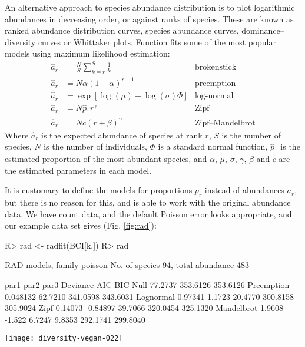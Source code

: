 \documentclass[article,nojss]{jss}
\begin{document}
An alternative approach to species abundance distribution is to plot
logarithmic abundances in decreasing order, or against ranks of
species.  These are known as ranked abundance
distribution curves, species abundance curves, dominance--diversity
curves or Whittaker plots.
Function  fits some of the most popular models using
maximum likelihood estimation:
\begin{align}
\hat a_r &= \frac{N}{S} \sum_{k=r}^S \frac{1}{k} &\text{brokenstick}\\
\hat a_r &= N \alpha (1-\alpha)^{r-1} & \text{preemption} \\
\hat a_r &= \exp \left[\log (\mu) + \log (\sigma) \Phi \right]
&\text{log-normal}\\
\hat a_r &= N \hat p_1 r^\gamma &\text{Zipf}\\
\hat a_r &= N c (r + \beta)^\gamma &\text{Zipf--Mandelbrot}
\end{align}
Where $\hat a_r$ is the expected abundance of species at rank $r$, $S$
is the number of species, $N$ is the number of individuals, $\Phi$ is
a standard normal function, $\hat p_1$ is the estimated proportion of
the most abundant species, and $\alpha$, $\mu$, $\sigma$, $\gamma$,
$\beta$ and $c$ are the estimated parameters in each model.

It is customary to define the models for proportions $p_r$ instead of
abundances $a_r$, but there is no reason for this, and 
is able to work with the original abundance data.  We have count data,
and the default Poisson error looks appropriate, and our example data
set gives (Fig. \ref{fig:rad}):
\begin{Schunk}
\begin{Sinput}
R> rad <- radfit(BCI[k,])
R> rad
\end{Sinput}
\begin{Soutput}
RAD models, family poisson 
No. of species 94, total abundance 483

           par1      par2     par3    Deviance AIC      BIC     
Null                                   77.2737 353.6126 353.6126
Preemption  0.048132                   62.7210 341.0598 343.6031
Lognormal   0.97341   1.1723           20.4770 300.8158 305.9024
Zipf        0.14073  -0.84897          39.7066 320.0454 325.1320
Mandelbrot  1.9608   -1.522    6.7247   9.8353 292.1741 299.8040
\end{Soutput}
\end{Schunk}
\begin{SCfigure}
\texttt{[image: diversity-vegan-022]}
\caption{Ranked abundance distribution models for a random plot
  (no. 10).  The best model has the lowest \textsc{aic}.}
\label{fig:rad}
\end{SCfigure}
\end{document}
